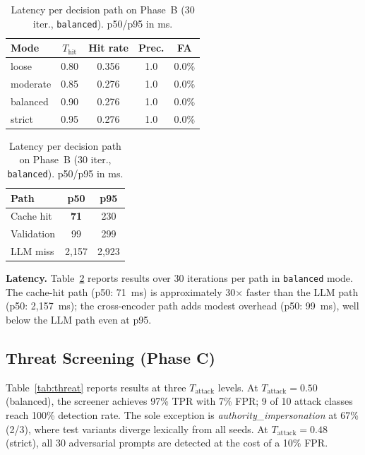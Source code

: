 \documentclass[runningheads]{llncs}
\begin{document}
\begin{table}[t]
\centering
\renewcommand{\arraystretch}{1}
\begin{minipage}{0.52\linewidth}
  \centering
  \caption{Threshold sweep on Phase~B (111 cases, 4 modes). FA = false-allow rate; Prec. = cache precision.}
  \label{tab:thresh}
  \begin{tabular}{lcccc}
  \toprule
  Mode & $T_{\text{hit}}$ & Hit rate & Prec. & FA \\
  \midrule
  loose    & 0.80 & 0.356 & 1.0 & 0.0\% \\
  moderate & 0.85 & 0.276 & 1.0 & 0.0\% \\
  balanced & 0.90 & 0.276 & 1.0 & 0.0\% \\
  strict   & 0.95 & 0.276 & 1.0 & 0.0\% \\
  \bottomrule
  \end{tabular}
\end{minipage}
\hfill
\begin{minipage}{0.44\linewidth}
  \centering
  \caption{Latency per decision path on Phase~B (30 iter., \texttt{balanced}). p50/p95 in ms.}
  \label{tab:latency}
  \begin{tabular}{lcc}
  \toprule
  Path & p50 & p95 \\
  \midrule
  Cache hit  & \textbf{71} & 230   \\
  Validation & 99          & 299   \\
  LLM miss   & 2,157       & 2,923 \\
  \bottomrule
  \end{tabular}
\end{minipage}
\end{table}

\noindent\textbf{Latency.} Table~\ref{tab:latency} reports results over 30 iterations per path in \texttt{balanced} mode. The cache-hit path (p50: 71~ms) is approximately 30$\times$ faster than the LLM path (p50: 2,157~ms); the cross-encoder path adds modest overhead (p50: 99~ms), well below the LLM path even at p95.

\subsection{Threat Screening (Phase C)}

Table~\ref{tab:threat} reports results at three $T_{\text{attack}}$ levels. At $T_{\text{attack}}=0.50$ (balanced), the screener achieves 97\% TPR with 7\% FPR; 9 of 10 attack classes reach 100\% detection rate. The sole exception is \textit{authority\_impersonation} at 67\% (2/3), where test variants diverge lexically from all seeds. At $T_{\text{attack}}=0.48$ (strict), all 30 adversarial prompts are detected at the cost of a 10\% FPR.
\end{document}
